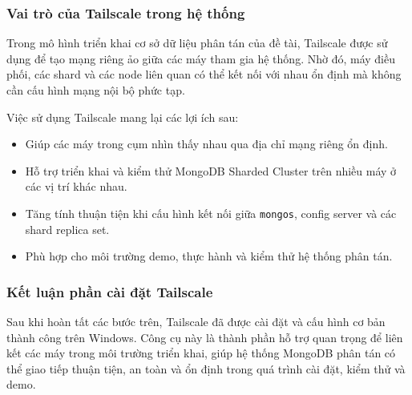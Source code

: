 \documentclass[12pt,a4paper]{article}
\begin{document}
\subsubsection{Vai trò của Tailscale trong hệ thống}

Trong mô hình triển khai cơ sở dữ liệu phân tán của đề tài, Tailscale được sử dụng để tạo mạng riêng ảo giữa các máy tham gia hệ thống. Nhờ đó, máy điều phối, các shard và các node liên quan có thể kết nối với nhau ổn định mà không cần cấu hình mạng nội bộ phức tạp.

Việc sử dụng Tailscale mang lại các lợi ích sau:
\begin{itemize}
    \item Giúp các máy trong cụm nhìn thấy nhau qua địa chỉ mạng riêng ổn định.
    \item Hỗ trợ triển khai và kiểm thử MongoDB Sharded Cluster trên nhiều máy ở các vị trí khác nhau.
    \item Tăng tính thuận tiện khi cấu hình kết nối giữa \texttt{mongos}, config server và các shard replica set.
    \item Phù hợp cho môi trường demo, thực hành và kiểm thử hệ thống phân tán.
\end{itemize}

\subsubsection{Kết luận phần cài đặt Tailscale}

Sau khi hoàn tất các bước trên, Tailscale đã được cài đặt và cấu hình cơ bản thành công trên Windows. Công cụ này là thành phần hỗ trợ quan trọng để liên kết các máy trong môi trường triển khai, giúp hệ thống MongoDB phân tán có thể giao tiếp thuận tiện, an toàn và ổn định trong quá trình cài đặt, kiểm thử và demo.
\end{document}
